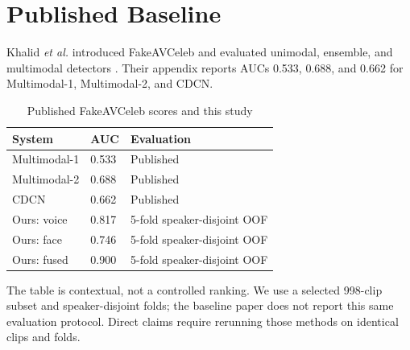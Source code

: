 \documentclass[conference]{IEEEtran}
\begin{document}
\section{Published Baseline}
Khalid \emph{et al.} introduced FakeAVCeleb and evaluated unimodal, ensemble, and multimodal detectors \cite{khalid}. Their appendix reports AUCs 0.533, 0.688, and 0.662 for Multimodal-1, Multimodal-2, and CDCN.
\begin{table}[t]\caption{Published FakeAVCeleb scores and this study}\label{tab:base}\centering\footnotesize
\begin{tabular}{lll}\toprule System&AUC&Evaluation\\\midrule
Multimodal-1 \cite{khalid}&0.533&Published\\
Multimodal-2 \cite{khalid}&0.688&Published\\
CDCN \cite{khalid}&0.662&Published\\
Ours: voice&0.817&5-fold speaker-disjoint OOF\\
Ours: face&0.746&5-fold speaker-disjoint OOF\\
Ours: fused&0.900&5-fold speaker-disjoint OOF\\\bottomrule\end{tabular}\end{table}
The table is contextual, not a controlled ranking. We use a selected 998-clip subset and speaker-disjoint folds; the baseline paper does not report this same evaluation protocol. Direct claims require rerunning those methods on identical clips and folds.
\end{document}
